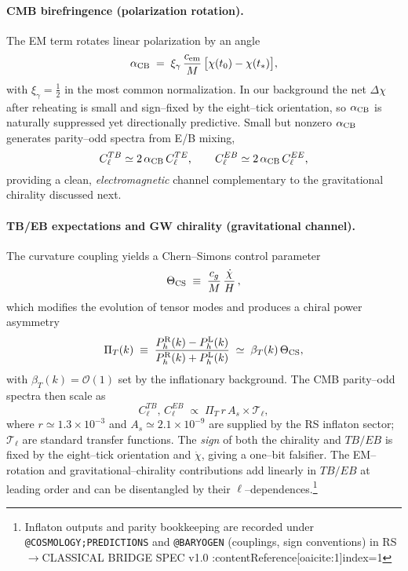 \documentclass[11pt]{article}
\begin{document}
\paragraph{CMB birefringence (polarization rotation).}
The EM term rotates linear polarization by an angle
\begin{equation}
  \alpha_{\rm CB} \;=\; \xi_\gamma\,\frac{c_{\rm em}}{M}\,\big[\chi(t_0)-\chi(t_{\ast})\big],
\end{equation}
with \(\xi_\gamma=\tfrac12\) in the most common normalization. In our background the net \(\Delta\chi\) after reheating is small and sign–fixed by the eight–tick orientation, so \(\alpha_{\rm CB}\) is naturally suppressed yet directionally predictive. Small but nonzero \(\alpha_{\rm CB}\) generates parity–odd spectra from E/B mixing,
\begin{equation}
  C_\ell^{TB}\simeq 2\,\alpha_{\rm CB}\,C_\ell^{TE},\qquad
  C_\ell^{EB}\simeq 2\,\alpha_{\rm CB}\,C_\ell^{EE},
\end{equation}
providing a clean, \emph{electromagnetic} channel complementary to the gravitational chirality discussed next.

\paragraph{TB/EB expectations and GW chirality (gravitational channel).}
The curvature coupling yields a Chern–Simons control parameter
\begin{equation}
  \Theta_{\rm CS}\;\equiv\;\frac{c_g}{M}\,\frac{\dot\chi}{H}\,,
\end{equation}
which modifies the evolution of tensor modes and produces a chiral power asymmetry
\begin{equation}
  \Pi_T(k)\;\equiv\;\frac{P_h^{\rm R}(k)-P_h^{\rm L}(k)}{P_h^{\rm R}(k)+P_h^{\rm L}(k)} \;\simeq\; \beta_T(k)\,\Theta_{\rm CS},
\end{equation}
with \(\beta_T(k)=\mathcal{O}(1)\) set by the inflationary background. The CMB parity–odd spectra then scale as
\begin{equation}
  C_\ell^{TB},\,C_\ell^{EB} \;\propto\; \Pi_T\,r\,A_s\times \mathcal{T}_\ell,
\end{equation}
where \(r\simeq 1.3\times 10^{-3}\) and \(A_s\simeq 2.1\times 10^{-9}\) are supplied by the RS inflaton sector; \(\mathcal{T}_\ell\) are standard transfer functions. The \emph{sign} of both the chirality and \(TB/EB\) is fixed by the eight–tick orientation and \(\dot\chi\), giving a one–bit falsifier. The EM–rotation and gravitational–chirality contributions add linearly in \(TB/EB\) at leading order and can be disentangled by their \(\ell\)–dependences.\footnote{Inflaton outputs and parity bookkeeping are recorded under \texttt{@COSMOLOGY;PREDICTIONS} and \texttt{@BARYOGEN} (couplings, sign conventions) in RS\(\to\)CLASSICAL BRIDGE SPEC v1.0 :contentReference[oaicite:1]{index=1}}
\end{document}
